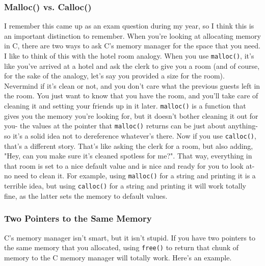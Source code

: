 \documentclass[english, 10pt]{article}
\begin{document}
\subsubsection{Malloc() vs. Calloc()}

I remember this came up as an exam question during my year, so I think this is an important distinction to remember. When you're looking at allocating memory in C, there are two ways to ask C's memory manager for the space that you need. I like to think of this with the hotel room analogy. When you use \texttt{malloc()}, it's like you've arrived at a hotel and ask the clerk to give you a room (and of course, for the sake of the analogy, let's say you provided a size for the room). Nevermind if it's clean or not, and you don't care what the previous guests left in the room. You just want to know that you have the room, and you'll take care of cleaning it and setting your friends up in it later. \texttt{malloc()} is a function that gives you the memory you're looking for, but it doesn't bother cleaning it out for you- the values at the pointer that \texttt{malloc()} returns can be just about anything- so it's a solid idea not to dereference whatever's there. Now if you use \texttt{calloc()}, that's a different story. That's like asking the clerk for a room, but also adding, "Hey, can you make sure it's cleaned spotless for me?". That way, everything in that room is set to a nice default value and is nice and ready for you to look at- no need to clean it. For example, using \texttt{malloc()} for a string and printing it is a terrible idea, but using \texttt{calloc()} for a string and printing it will work totally fine, as the latter sets the memory to default values.

\subsubsection{Two Pointers to the Same Memory}

C's memory manager isn't smart, but it isn't stupid. If you have two pointers to the same memory that you allocated, using \texttt{free()} to return that chunk of memory to the C memory manager will totally work. Here's an example.\newline
\end{document}
